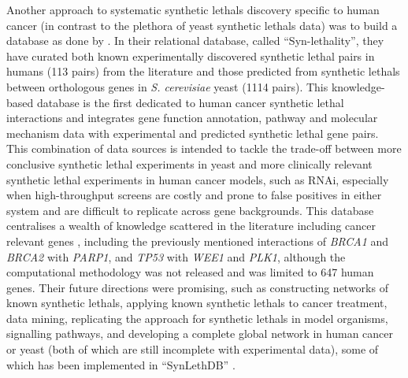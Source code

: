 Another approach to systematic \glspl{synthetic lethal} discovery specific to human cancer (in contrast to the plethora of yeast \glspl{synthetic lethal} data) was to build a database as done by \citet{Li2014}. In their relational database, called ``Syn-lethality'', they have curated both known experimentally discovered \gls{synthetic lethal} pairs in humans (113 pairs) from the literature and those predicted from \glspl{synthetic lethal} between orthologous genes in \textit{S. cerevisiae} yeast (1114 pairs). This knowledge-based database is the first dedicated to human cancer \gls{synthetic lethal} interactions and integrates gene function annotation, \gls{pathway} and molecular mechanism data with experimental and predicted \gls{synthetic lethal} gene pairs. This combination of data sources is intended to tackle the trade-off between more conclusive \gls{synthetic lethal} experiments in yeast and more clinically relevant \gls{synthetic lethal} experiments in human cancer models, such as \gls{RNAi}, especially when high-throughput screens are costly and prone to false positives in either system and are difficult to replicate across gene backgrounds. This database centralises a wealth of knowledge scattered in the literature including cancer relevant genes%
, including the previously mentioned interactions of \textit{BRCA1} and \textit{BRCA2} with \textit{PARP1}, and \textit{TP53} with \textit{WEE1} and \textit{PLK1}, although the computational methodology was not released %
and was limited to 647 human genes. Their future directions were promising, such as constructing networks of known \glspl{synthetic lethal}, applying known \glspl{synthetic lethal} to cancer treatment, data mining, replicating the approach for \glspl{synthetic lethal} in model organisms, signalling pathways, and developing a complete global network in human cancer or yeast (both of which are still incomplete with experimental data), some of which has been implemented in ``SynLethDB'' \citep{Guo2016}.  

